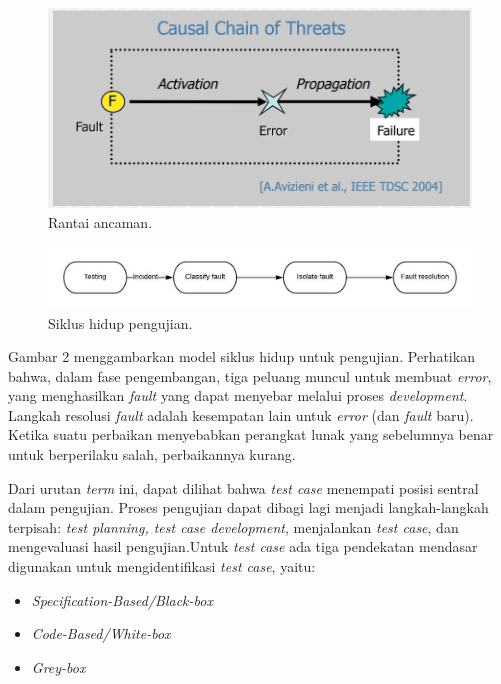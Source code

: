 \documentclass[a4paper,twoside]{article}
\begin{document}
\begin{enumerate}
\begin{figure}[h!]
	\includegraphics[scale=0.5]{../DokumenSkripsi/gambar/fault}
	\centering
	\caption{Rantai ancaman.}
\end{figure}
\begin{figure}
	\includegraphics[scale=1.0]{../DokumenSkripsi/gambar/cycle2}
	\centering
	\caption{Siklus hidup pengujian.}
\end{figure}
Gambar 2 menggambarkan model siklus hidup untuk pengujian. Perhatikan bahwa, dalam fase pengembangan, tiga peluang muncul untuk membuat \textit{error}, yang menghasilkan \textit{fault} yang dapat menyebar melalui proses \textit{development}. Langkah resolusi \textit{fault} adalah kesempatan lain untuk \textit{error} (dan \textit{fault} baru). Ketika suatu perbaikan menyebabkan perangkat lunak yang sebelumnya benar untuk berperilaku salah, perbaikannya kurang.

Dari urutan \textit{term} ini, dapat dilihat bahwa \textit{test case} menempati posisi sentral dalam pengujian. Proses pengujian dapat dibagi lagi menjadi langkah-langkah terpisah: \textit{test planning, test case development}, menjalankan \textit{test case}, dan mengevaluasi hasil pengujian.Untuk \textit{test case} ada tiga pendekatan mendasar digunakan untuk mengidentifikasi \textit{test case}, yaitu:
\begin{itemize}
	\item \textit{Specification-Based/Black-box}
	\item \textit{Code-Based/White-box}
	\item \textit{Grey-box}
\end{itemize} 



\end{enumerate}
\end{document}
